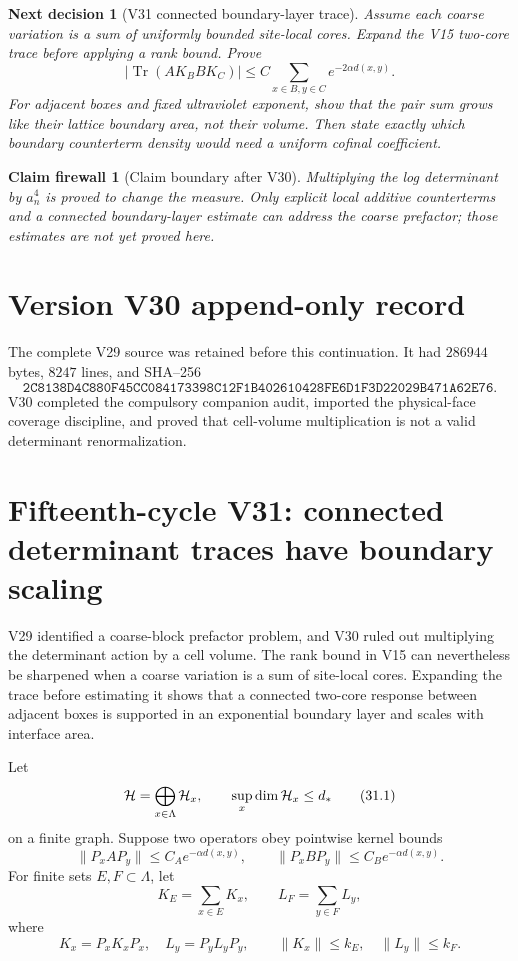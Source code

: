 \documentclass[11pt]{article}
\newtheorem{firewall}[theorem]{Claim firewall}
\newtheorem{decision}[theorem]{Next decision}
\theoremstyle{remark}
\begin{document}
\begin{decision}[V31 connected boundary-layer trace]
\label{dec:v15v30-next}
Assume each coarse variation is a sum of uniformly bounded
site-local cores.  Expand the V15 two-core trace before applying a
rank bound.  Prove
\[
 |\operatorname{Tr}(AK_BBK_C)|
 \le C\sum_{x\in B,y\in C}e^{-2\alpha d(x,y)}.
\]
For adjacent boxes and fixed ultraviolet exponent, show that the
pair sum grows like their lattice boundary area, not their volume.
Then state exactly which boundary counterterm density would need a
uniform cofinal coefficient.
\end{decision}

\begin{firewall}[Claim boundary after V30]
\label{fire:v15v30}
Multiplying the log determinant by \(a_n^4\) is proved to change the
measure.  Only explicit local additive counterterms and a connected
boundary-layer estimate can address the coarse prefactor; those
estimates are not yet proved here.
\end{firewall}

\section*{Version V30 append-only record}
The complete V29 source was retained before this continuation.  It
had \(286944\) bytes, \(8247\) lines, and SHA--256
\[
 \texttt{2C8138D4C880F45CC084173398C12F1B402610428FE6D1F3D22029B471A62E76}.
\]
V30 completed the compulsory companion audit, imported the
physical-face coverage discipline, and proved that cell-volume
multiplication is not a valid determinant renormalization.
\section{Fifteenth-cycle V31: connected determinant traces have boundary scaling}
\label{sec:v15v31}

V29 identified a coarse-block prefactor problem, and V30 ruled out
multiplying the determinant action by a cell volume.  The rank bound
in V15 can nevertheless be sharpened when a coarse variation is a
sum of site-local cores.  Expanding the trace before estimating it
shows that a connected two-core response between adjacent boxes is
supported in an exponential boundary layer and scales with interface
area.

Let
\[
 {\cal H}=\bigoplus_{x\in\Lambda}{\cal H}_x,\qquad
 \sup_x\dim{\cal H}_x\le d_*                               \tag{31.1}
\]
on a finite graph.  Suppose two operators obey pointwise kernel
bounds
\[
 \|P_xAP_y\|\le C_Ae^{-\alpha d(x,y)},\qquad
 \|P_xBP_y\|\le C_Be^{-\alpha d(x,y)}.                     \tag{31.2}
\]
For finite sets \(E,F\subset\Lambda\), let
\[
 K_E=\sum_{x\in E}K_x,\qquad
 L_F=\sum_{y\in F}L_y,                                     \tag{31.3}
\]
where
\[
 K_x=P_xK_xP_x,\quad L_y=P_yL_yP_y,\qquad
 \|K_x\|\le k_E,\quad\|L_y\|\le k_F.                       \tag{31.4}
\]
\end{document}
